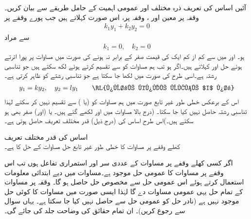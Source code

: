 آئیں اساس کی تعریف ذرہ مختلف اور عمومی اہمیت کے حامل طریقے سے بیان کریں۔  وقفہ  پر معین  اور ، وقفہ   پر، اس صورت  کہلاتے ہیں جب پورے وقفے پر
\begin{align}\label{مساوات_سادہ_دو_درجی_خطی_طور_غیر_تابع_الف}
k_1 y_1+k_2 y_2=0
\end{align}
سے مراد 
\begin{align}
k_1=0, \quad k_2=0
\end{align}
ہو۔ اور  میں سے کم از کم ایک کی قیمت صفر کے برابر نہ ہونے کی صورت میں مساوات  پر پورا اترتے ہوئے حل  اور   کہلاتے ہیں۔اگر  ہو تب ہم مساوات  کو  سے تقسیم کرتے ہوئے  لکھ سکتے ہیں جو تناسبی رشتہ ہے۔اسی طرح  کی صورت میں  لکھا جا سکتا ہے جو تناسبی رشتے کو ظاہر کرتی ہے۔
\begin{align}
y_1=k y_2,\quad y_2=l y_1 \quad \quad  \text{\RL{پورے کھلے وقفے $I$ پر}}
\end{align}
اس کے برعکس خطی طور غیر تابع صورت میں ہم مساوات  کو  (یا ) سے تقسیم نہیں کر سکتے لہٰذا  تناسبی رشتہ حاصل نہیں کیا جا سکتا۔ (درج بالا مساوات میں  اور  لکھے گئے ہیں۔ یا (اور)  صفر بھی ہو سکتے ہیں۔)اس طرح اساس کی (درج ذیل) قدر مختلف تعریف حاصل ہوتی ہے۔

\quad اساس کی قدر مختلف تعریف\\
کھلے وقفے  پر مساوات  کا خطی طور غیر تابع حل   مساوات  کے حل کا  ہے۔

اگر کسی کھلے وقفے  پر  مساوات  کے  عددی سر  اور  استمراری تفاعل ہوں تب اس وقفے پر مساوات   کا عمومی حل موجود ہے۔مساوات  میں دیے ابتدائی معلومات استعمال کرتے ہوئے اس عمومی حل سے  مخصوص حل حاصل ہو گا۔ وقفہ  پر مساوات  کے تمام حل یہی عمومی مساوات دے گا لہٰذا ایسی صورت میں مساوات کا کوئی  حل موجود نہیں ہے (نادر حل کو عمومی حل سے حاصل نہیں کیا جا سکتا ہے۔ یہاں سوال  سے رجوع کریں)۔ ان تمام حقائق کی وضاحت جلد کی جائے گی۔

